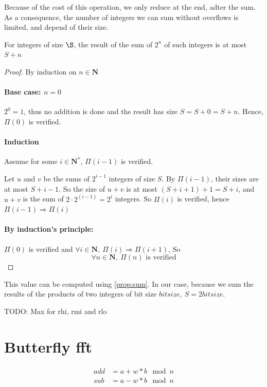 \documentclass[a4paper]{article}
\begin{document}
Because of the cost of this operation, we only reduce at the end, adter the sum. As a consequence, the number of integers we can sum without overflows is limited, and depend of their size.

\begin{proposition}\label{prop:sum}
    For integers of size $\S$, the result of the sum of $2^n$ of such integers is at most $S + n$
\end{proposition}

\begin{proof}
    By induction on $n\in\mathbf{N}$

    \paragraph{Base case: $n = 0$}
    $2^0 = 1$, thus no addition is done and the result has size $S = S + 0 = S + n$. Hence, $\Pi(0)$ is verified.

    \paragraph{Induction}
    Assume for some $i \in \mathbf{N}^*$, $\Pi(i - 1)$ is verified.

    Let $u$ and $v$ be the sums of $2^{i-1}$ integers of size $ S $. By $\Pi(i-1)$, their sizes are at most $S + i - 1$. So the size of $u + v$ is at most $\left(S + i + 1\right) + 1 = S + i$, and $u + v$ is the sum of $2 \cdot 2^(i-1) = 2^i$ integers.
    So $\Pi(i)$ is verified, hence $\Pi(i-1) \Rightarrow \Pi(i)$

    \paragraph{By induction's principle:} $\Pi(0)$ is verified and $\forall i\in\mathbf{N},\ \Pi(i) \Rightarrow \Pi(i+1)$, So
    \begin{displaymath}
        \forall n\in\mathbf{N},\ \Pi(n)\text{ is verified}
    \end{displaymath}
\end{proof}

This value can be computed using \ref{prop:sum}. In our case, because we sum the results of the products of two integers of bit size $bitsize,\ S = 2 bitsize$.

TODO: Max for rhi, rmi and rlo



\section{Butterfly fft}
\begin{align*}
    add &= a + w*b \mod n \\
    sub &= a - w*b \mod n 
\end{align*}
\end{document}
